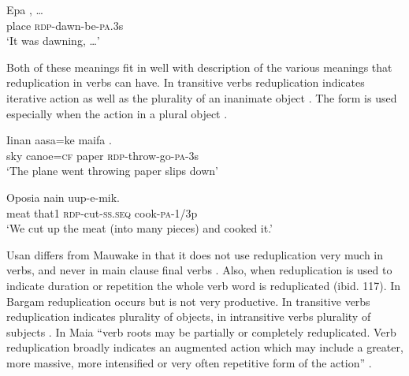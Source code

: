\ea%
\label{ex:3:x692}
\gll Epa , {\dots} \\
place \textsc{rdp}-dawn-be-\textsc{pa}.3s\\
\glt`It was dawning, {\dots}'
\z

Both of these meanings fit in well with  description of the various meanings that reduplication in verbs can have. In transitive verbs reduplication indicates iterative action as well as the plurality of an inanimate object . The form is used especially when the action  in a plural object .

\ea%
\label{ex:3:x219}
\gll Iinan aasa=ke maifa . \\
sky canoe=\textsc{cf} paper \textsc{rdp}-throw-go-\textsc{pa}-3s \\
\glt`The plane went throwing paper slips down' 
\z

\ea%
\label{ex:3:x220}
\gll Oposia nain  uup-e-mik. \\
meat that1 \textsc{rdp}-cut-\textsc{ss}.\textsc{seq} cook-\textsc{pa}-1/3p \\
\glt`We cut up the meat (into many pieces) and cooked it.'
\z

Usan differs from Mauwake in that it does not use reduplication very much in verbs, and never in main clause final verbs \citep[116]{Reesink1987}. Also, when reduplication is used to indicate duration or repetition the whole verb word is reduplicated (ibid. 117). In Bargam reduplication occurs but is not very productive. In transitive verbs reduplication indicates plurality of objects, in intransitive verbs plurality of subjects \citep[19]{Hepner2002}. In Maia ``{verb roots may be partially or completely reduplicated. Verb reduplication broadly indicates an augmented action which may include a greater, more massive, more intensified or very often repetitive form of the action}'' \citep[50]{Hardin2002}.

